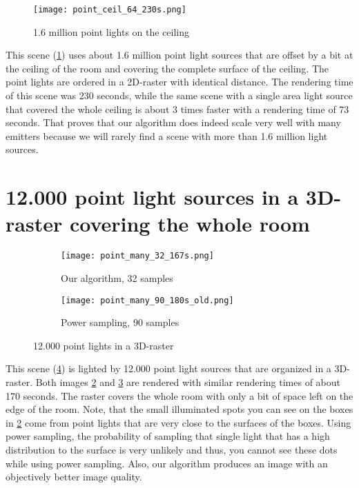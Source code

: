 \begin{figure}
	\begin{center}
		\texttt{[image: point\_ceil\_64\_230s.png]}
		\caption{1.6 million point lights on the ceiling}
		\label{fig:many}
	\end{center}
\end{figure}

This scene (\ref{fig:many}) uses about 1.6 million point light sources that are offset by a bit at the ceiling of the room and covering the complete surface of the ceiling. The point lights are ordered in a 2D-raster with identical distance. The rendering time of this scene was 230 seconds, while the same scene with a single area light source that covered the whole ceiling
is about 3 times faster with a rendering time of 73 seconds. That proves that our algorithm does indeed scale very well with many emitters because we will rarely find a scene with more than 1.6 million light sources.

\section{12.000 point light sources in a 3D-raster covering the whole room}

\begin{figure}
	\centering
	\begin{subfigure}{.5\textwidth}
		\centering
		\texttt{[image: point\_many\_32\_167s.png]}
		\caption{Our algorithm, 32 samples}
		\label{fig:point1}
	\end{subfigure}%
	\begin{subfigure}{.5\textwidth}
		\centering
		\texttt{[image: point\_many\_90\_180s\_old.png]}
		\caption{Power sampling, 90 samples}
		\label{fig:point2}
	\end{subfigure}
	\caption{12.000 point lights in a 3D-raster}
	\label{pointl}
\end{figure}

This scene (\ref{pointl}) is lighted by 12.000 point light sources that are organized in a 3D-raster. Both images \ref{fig:point1} and \ref{fig:point2} are rendered with similar rendering times of about 170 seconds. The raster covers the whole room with only a bit of space left on the edge of the room. Note, that the small illuminated spots you can see on the boxes in \ref{fig:point1} come from point lights that are very close to the surfaces of the boxes. Using power sampling, the probability of sampling that single light that has a high distribution to the surface is very unlikely and thus, you cannot see these dots while using power sampling. Also, our algorithm produces an image with an objectively better image quality.

